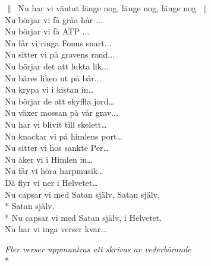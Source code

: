 \begin{SongText}
    \begin{SongVerse}
        $\|\:$ Nu har vi väntat länge nog, länge nog, länge nog $\:\|$\\%
        Nu börjar vi få gråa hår ...\\%
        Nu börjar vi få ATP ...\\%
        Nu får vi ringa Fonus snart...\\%
        Nu sitter vi på gravens rand...\\%
        Nu börjar det att lukta lik...\\%
        Nu bäres liken ut på bår...\\%
        Nu krypa vi i kistan in…\\%
        Nu börjar de att skyffla jord…\\%
        Nu växer mossan på vår grav...\\%
        Nu har vi blivit till skelett…\\%
        Nu knackar vi på himlens port…\\%
        Nu sitter vi hos sankte Per…\\%
        Nu åker vi i Himlen in…\\%
        Nu får vi höra harpmusik…\\%
        Då flyr vi ner i Helvetet…\\%
        Nu capsar vi med Satan själv, Satan själv,\\*%
        Satan själv.\\*%
        Nu capsar vi med Satan själv, i Helvetet.\\%
        Nu har vi inga verser kvar...
    \end{SongVerse}
    \begin{SongVerse}
        \textit{Fler verser uppmuntras att skrivas av vederbörande}\\*
        \hrulefill%

        \hrulefill%

        \hrulefill%

        \hrulefill%

        \hrulefill%

        \hrulefill%

        \hrulefill%

        \hrulefill%

        \hrulefill%
    \end{SongVerse}
\end{SongText}

